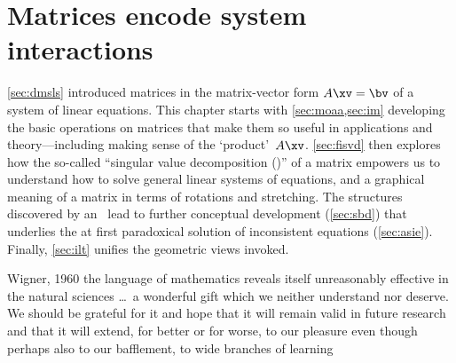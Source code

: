
\chapter{Matrices encode system interactions}
\label{ch:m}

\minitoc




\cref{sec:dmsls} introduced matrices in the matrix-vector form \(A\xv=\bv\) of a system of linear equations.
This chapter starts with \cref{sec:moaa,sec:im} developing the basic operations on matrices that make them so useful in applications and theory---including making sense of the `product'~\(A\xv\).
\cref{sec:fisvd} then explores how the so-called ``singular value decomposition (\svd)'' of a matrix empowers us to understand how to solve general linear systems of equations, and a graphical meaning of a matrix in terms of rotations and stretching.
The structures discovered by an \svd\ lead to further conceptual development (\cref{sec:sbd}) that underlies the at first paradoxical solution of inconsistent equations (\cref{sec:asie}).
Finally, \cref{sec:ilt} unifies the geometric views invoked.



\begin{quoted}{Wigner, 1960 \cite[p.3]{Mandelbrot1982}}
the language of mathematics reveals itself unreasonably effective in the natural sciences \ldots\ a wonderful gift which we neither understand nor deserve.  We should be grateful for it and hope that it will remain valid in future research and that it will extend, for better or for worse, to our pleasure even though perhaps also to our bafflement, to wide branches of learning
\end{quoted}



